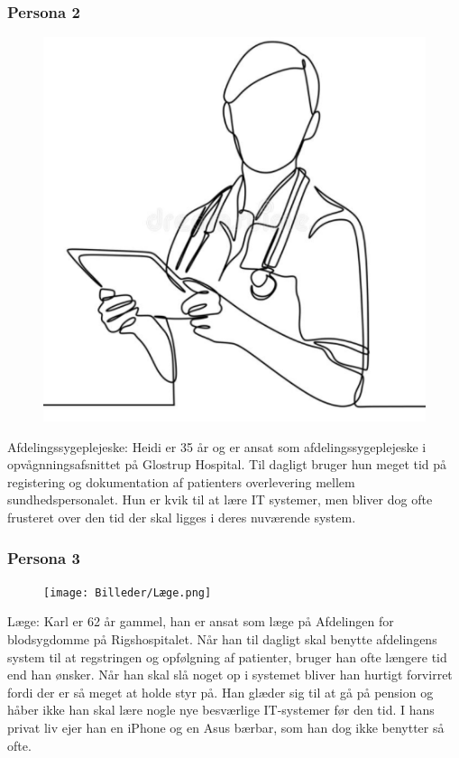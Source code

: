 \subsubsection{Persona 2}
\begin{figure}
\includegraphics[width=0.9\linewidth]{Billeder/Afd- SPL.png} 
\end{figure}
Afdelingssygeplejeske: 
Heidi er 35 år og er ansat som afdelingssygeplejeske i opvågnningsafsnittet på Glostrup Hospital. Til dagligt bruger hun meget tid på registering og dokumentation af patienters overlevering mellem sundhedspersonalet. Hun er kvik til at lære IT systemer, men bliver dog ofte frusteret over den tid der skal ligges i deres nuværende system. 


\subsubsection{Persona 3}

\begin{figure}
\texttt{[image: Billeder/Læge.png]} 
\end{figure}

Læge: 
Karl er 62 år gammel, han er ansat som læge på Afdelingen for blodsygdomme på Rigshospitalet. Når han til dagligt skal benytte afdelingens system til at regstringen og opfølgning af patienter, bruger han ofte længere tid end han ønsker. Når han skal slå noget op i systemet bliver han hurtigt forvirret fordi der er så meget at holde styr på. Han glæder sig til at gå på pension og håber ikke han skal lære nogle nye besværlige IT-systemer før den tid.
I hans privat liv ejer han en iPhone og en Asus bærbar, som han dog ikke benytter så ofte. 


